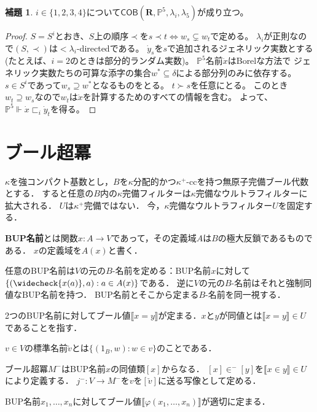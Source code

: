 \documentclass[uplatex,dvipdfmx]{jsarticle}
\newcommand\forces{\Vdash}
\newcommand{\COB}{\mathsf{COB}}
\newcommand{\relR}{\mathbf{R}}
\newcommand{\Pa}{\mathbb{P}^5}
\newcommand{\truth}[1]{\llbracket #1 \rrbracket}
\renewcommand\emptyset{\varnothing}
\theoremstyle{definition}
\newtheorem{lem}[thm]{補題}
\begin{document}
	\begin{lem}
		$i \in \{1,2,3,4\}$について$\COB(\relR, \Pa, \lambda_i, \lambda_5)$が成り立つ。
	\end{lem}
	\begin{proof}
		$S=S^i$とおき、$S$上の順序$\prec$を$s\prec t \iff w_s\subsetneq w_t$で定める。
		$\lambda_i$が正則なので$(S,\prec)$は${<}\lambda_i$-directedである。
		$\dot{y}_s$を$s$で追加されるジェネリック実数とする (たとえば、$i=2$のときは部分的ランダム実数)。
		$\Pa$名前$\dot{x}$はBorelな方法で 
		ジェネリック実数たちの可算な添字の集合$w^*\subseteq \delta$による部分列のみに依存する。
		$s\in S^i$であって$w_s\supseteq w^*$となるものをとる。
		$t\succ s$を任意にとる。
		このとき$w_t\supseteq w_s$なので$w_t$は$\dot{x}$を計算するためのすべての情報を含む。
		よって、$\Pa \forces \dot{x} \sqsubset_i \dot{y}_t$を得る。
	\end{proof}
	
	
	\section{ブール超冪}
	
	$\kappa$を強コンパクト基数とし，$B$を$\kappa$分配的かつ$\kappa^+$-ccを持つ無原子完備ブール代数とする．
	すると任意の$B$内の$\kappa$完備フィルターは$\kappa$完備なウルトラフィルターに拡大される．
	$U$は$\kappa^+$完備ではない．
	今，$\kappa$完備なウルトラフィルター$U$を固定する．
	
	\textbf{BUP名前}とは関数$x \colon A \to V$であって，その定義域$A$は$B$の極大反鎖であるものである．
	$x$の定義域を$A(x)$と書く．
	
	任意のBUP名前は$V$の元の$B$-名前を定める：BUP名前$x$に対して$\{ (\widecheck{x(a)}, a) : a \in A(x) \}$である．
	逆に$V$の元の$B$-名前はそれと強制同値なBUP名前を持つ．
	BUP名前とそこから定まる$B$-名前を同一視する．
	
	2つのBUP名前に対してブール値$\truth{x=y}$が定まる．$x$と$y$が同値とは$\truth{x=y} \in U$であることを指す．
	
	$v \in V$の標準名前$\check{v}$とは$\{ (1_B, w) : w \in v \}$のことである．
	
	ブール超冪$M^-$はBUP名前$x$の同値類$[x]$からなる．
	$[x] \in^- [y]$を$\truth{x \in y} \in U$により定義する．
	$j^- \colon V \to M^-$を$v$を$[\check{v}]$に送る写像として定める．
	
	BUP名前$x_1, \dots, x_n$に対してブール値$\truth{\varphi(x_1, \dots, x_n)}$が適切に定まる．
\end{document}
